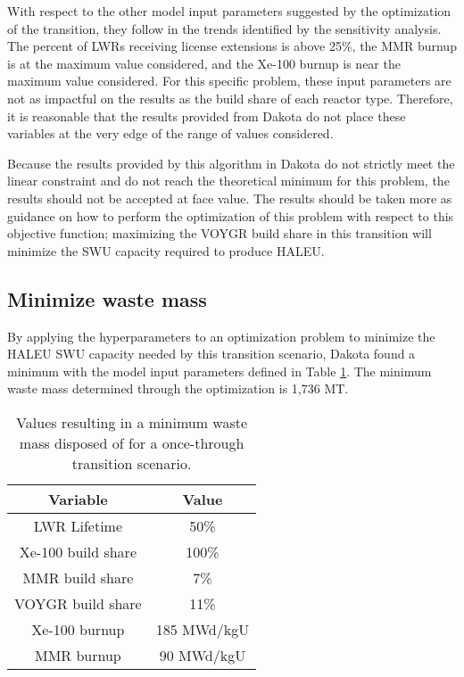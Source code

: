 With respect to the other model input parameters suggested by the optimization 
of the transition, they follow in the trends identified by the 
sensitivity analysis. The percent of \glspl{LWR} receiving license extensions
is above 25\%, the \gls{MMR} burnup is at the maximum value considered, 
and the Xe-100 burnup is near the maximum value considered. For this specific 
problem, these input parameters are not as impactful on the results as the 
build share of each reactor type. Therefore, it is reasonable that the 
results provided from Dakota do not place these variables at the very 
edge of the range of values considered. 

Because the results provided by this algorithm in Dakota do not strictly 
meet the linear constraint and do not reach the theoretical minimum for 
this problem, the results should not be accepted at face value. The results should 
be taken more as guidance on how to perform the optimization of this problem 
with respect to this objective function; maximizing the VOYGR build share in 
this transition will minimize the \gls{SWU} capacity required to produce \gls{HALEU}.

\subsection{Minimize waste mass}
By applying the hyperparameters to an optimization problem to minimize the 
\gls{HALEU} \gls{SWU} capacity needed by this transition scenario, Dakota
found a minimum with the model input parameters defined in Table 
\ref{tab:soga_ot_waste}. The minimum waste mass determined through the 
optimization is 1,736 MT. 

\begin{table}
    \centering 
    \caption{Values resulting in a minimum waste mass disposed of for 
              a once-through transition scenario.}
    \label{tab:soga_ot_waste}
    \begin{tabular}{c c}
        \hline
        Variable & Value \\
        \hline
        LWR Lifetime & 50\%\\
        Xe-100 build share & 100\%\\
        MMR build share & 7\%\\
        VOYGR build share & 11\%\\
        Xe-100 burnup & 185 MWd/kgU\\
        MMR burnup & 90 MWd/kgU\\
        \hline
    \end{tabular}
\end{table}

